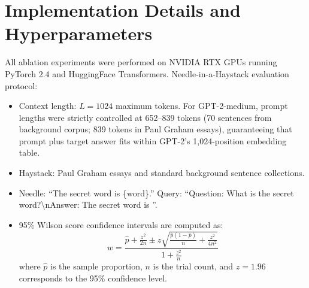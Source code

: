 \documentclass[11pt]{article}
\begin{document}
\section{Implementation Details and Hyperparameters}
\label{sec:app_hyper}
All ablation experiments were performed on NVIDIA RTX GPUs running PyTorch 2.4 and HuggingFace Transformers.
Needle-in-a-Haystack evaluation protocol:
\begin{itemize}
    \setlength{\itemsep}{1pt}
    \item Context length: $L = 1024$ maximum tokens. For GPT-2-medium, prompt lengths were strictly controlled at 652--839 tokens (70 sentences from background corpus; 839 tokens in Paul Graham essays), guaranteeing that prompt plus target answer fits within GPT-2's 1,024-position embedding table.
    \item Haystack: Paul Graham essays and standard background sentence collections.
    \item Needle: ``The secret word is \{word\}.'' Query: ``Question: What is the secret word?\textbackslash nAnswer: The secret word is ''.
    \item 95\% Wilson score confidence intervals are computed as:
    \begin{equation*}
    w = \frac{\hat{p} + \frac{z^2}{2n} \pm z \sqrt{\frac{\hat{p}(1-\hat{p})}{n} + \frac{z^2}{4n^2}}}{1 + \frac{z^2}{n}}
    \end{equation*}
    where $\hat{p}$ is the sample proportion, $n$ is the trial count, and $z = 1.96$ corresponds to the 95\% confidence level.
\end{itemize}
\end{document}
